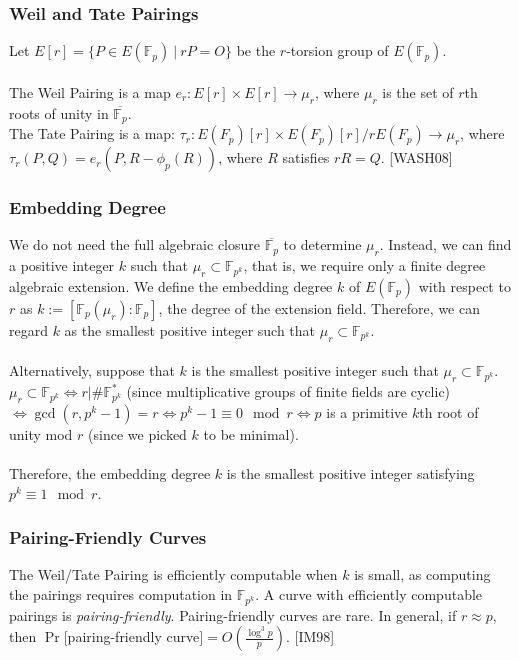 \documentclass[12pt,twoside]{article}
\newcommand\given[1][]{\:#1\vert\:}
\begin{document}
\subsubsection{Weil and Tate Pairings}
Let $E[r] = \{ P \in E(\mathbb F_p) \given rP = O\}$ be the $r$-torsion group of $E(\mathbb F_p)$.
\\ \\
\noindent The Weil Pairing is a map $e_r: E[r] \times E[r] \to \mu_r$, where $\mu_{r}$ is the set of $r$th roots of unity in $\overline{\mathbb F_p}$. \\ 

\noindent The Tate Pairing is a map: $\tau_r: E(F_p)[r] \times E(F_p)[r]/ rE(F_p) \to \mu_r$, where $\tau_r(P,Q) = e_r(P, R - \phi_p(R))$, where $R$ satisfies $r R = Q$. [WASH08]



 \subsubsection{Embedding Degree}
 
We do not need the full algebraic closure $\overline{\mathbb F_p}$ to determine $\mu_r$. Instead, we can find a positive integer $k$ such that $\mu_r \subset \mathbb F_{p^k}$, that is, we require only a finite degree algebraic extension. We define the embedding degree $k$ of $E(\mathbb F_p)$ with respect to $r$ as $k:= [\mathbb F_p(\mu_r) : \mathbb F_p]$, the degree of the extension field. Therefore, we can regard $k$ as the smallest positive integer such that $\mu_r \subset \mathbb F_{p^k}$.
\\ \\
\noindent Alternatively, suppose that $k$ is the smallest positive integer such that $\mu_r \subset \mathbb F_{p^k}$.  $\mu_r \subset \mathbb F_{p^k} \iff r \Big |  \# \mathbb F^*_{p^k}$ (since multiplicative groups of finite fields are cyclic) $ \iff \gcd(r, p^k-1) = r \iff p^k-1 \equiv 0 \mod r \iff p$ is a primitive $k$th root of unity mod $r$ (since we picked $k$ to be minimal). 
\\ \\
\noindent Therefore, the embedding degree $k$ is the smallest positive integer satisfying $p^k \equiv 1 \mod r$.

\subsubsection{Pairing-Friendly Curves}
The Weil/Tate Pairing is efficiently computable when $k$ is small, as computing the pairings requires computation in $\mathbb F_{p^k}$. A curve with efficiently computable pairings is {\it pairing-friendly}. Pairing-friendly curves are rare. In general, if $r \approx p$, then $\Pr[$pairing-friendly curve$] = O(\frac{\log^3 p}{p})$. [IM98]
\end{document}
